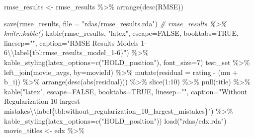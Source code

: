 \documentclass[
]{article}
\newenvironment{Shaded}{}{}
\newcommand{\AttributeTok}[1]{\textcolor[rgb]{0.49,0.56,0.16}{#1}}
\newcommand{\CommentTok}[1]{\textcolor[rgb]{0.38,0.63,0.69}{\textit{#1}}}
\newcommand{\ConstantTok}[1]{\textcolor[rgb]{0.53,0.00,0.00}{#1}}
\newcommand{\DecValTok}[1]{\textcolor[rgb]{0.25,0.63,0.44}{#1}}
\newcommand{\FunctionTok}[1]{\textcolor[rgb]{0.02,0.16,0.49}{#1}}
\newcommand{\NormalTok}[1]{#1}
\newcommand{\OtherTok}[1]{\textcolor[rgb]{0.00,0.44,0.13}{#1}}
\newcommand{\SpecialCharTok}[1]{\textcolor[rgb]{0.25,0.44,0.63}{#1}}
\newcommand{\StringTok}[1]{\textcolor[rgb]{0.25,0.44,0.63}{#1}}
\begin{document}
\begin{Shaded}
\begin{Highlighting}[]
\NormalTok{rmse\_results }\OtherTok{\textless{}{-}}\NormalTok{ rmse\_results }\SpecialCharTok{\%\textgreater{}\%} \FunctionTok{arrange}\NormalTok{(}\FunctionTok{desc}\NormalTok{(RMSE))}

\FunctionTok{save}\NormalTok{(rmse\_results, }\AttributeTok{file =} \StringTok{"rdas/rmse\_results.rda"}\NormalTok{)}
\CommentTok{\# rmse\_results \%\textgreater{}\% knitr::kable()}
  \FunctionTok{kable}\NormalTok{(rmse\_results, }\StringTok{"latex"}\NormalTok{, }\AttributeTok{escape=}\ConstantTok{FALSE}\NormalTok{, }\AttributeTok{booktabs=}\ConstantTok{TRUE}\NormalTok{, }\AttributeTok{linesep=}\StringTok{""}\NormalTok{, }\AttributeTok{caption=}\StringTok{"RMSE Results Models 1{-}6}\SpecialCharTok{\textbackslash{}\textbackslash{}}\StringTok{label\{tbl:rmse\_results\_model\_1{-}6\}"}\NormalTok{) }\SpecialCharTok{\%\textgreater{}\%}
    \FunctionTok{kable\_styling}\NormalTok{(}\AttributeTok{latex\_options=}\FunctionTok{c}\NormalTok{(}\StringTok{"HOLD\_position"}\NormalTok{), }\AttributeTok{font\_size=}\DecValTok{7}\NormalTok{)}
\NormalTok{test\_set }\SpecialCharTok{\%\textgreater{}\%} 
  \FunctionTok{left\_join}\NormalTok{(movie\_avgs, }\AttributeTok{by=}\StringTok{\textquotesingle{}movieId\textquotesingle{}}\NormalTok{) }\SpecialCharTok{\%\textgreater{}\%}
  \FunctionTok{mutate}\NormalTok{(}\AttributeTok{residual =}\NormalTok{ rating }\SpecialCharTok{{-}}\NormalTok{ (mu }\SpecialCharTok{+}\NormalTok{ b\_i)) }\SpecialCharTok{\%\textgreater{}\%}
  \FunctionTok{arrange}\NormalTok{(}\FunctionTok{desc}\NormalTok{(}\FunctionTok{abs}\NormalTok{(residual))) }\SpecialCharTok{\%\textgreater{}\%}  
  \FunctionTok{slice}\NormalTok{(}\DecValTok{1}\SpecialCharTok{:}\DecValTok{10}\NormalTok{) }\SpecialCharTok{\%\textgreater{}\%} 
  \FunctionTok{pull}\NormalTok{(title) }\SpecialCharTok{\%\textgreater{}\%} 
    \FunctionTok{kable}\NormalTok{(}\StringTok{"latex"}\NormalTok{, }\AttributeTok{escape=}\ConstantTok{FALSE}\NormalTok{, }\AttributeTok{booktabs=}\ConstantTok{TRUE}\NormalTok{, }\AttributeTok{linesep=}\StringTok{""}\NormalTok{, }
          \AttributeTok{caption=}\StringTok{"Without Regularization 10 largest mistakes}\SpecialCharTok{\textbackslash{}\textbackslash{}}\StringTok{label\{tbl:without\_regularization\_10\_largest\_mistakes\}"}\NormalTok{) }\SpecialCharTok{\%\textgreater{}\%} 
      \FunctionTok{kable\_styling}\NormalTok{(}\AttributeTok{latex\_options=}\FunctionTok{c}\NormalTok{(}\StringTok{"HOLD\_position"}\NormalTok{))}
\FunctionTok{load}\NormalTok{(}\StringTok{"rdas/edx.rda"}\NormalTok{)}
\NormalTok{movie\_titles }\OtherTok{\textless{}{-}}\NormalTok{ edx }\SpecialCharTok{\%\textgreater{}\%} 

\end{Highlighting}
\end{Shaded}
\end{document}
